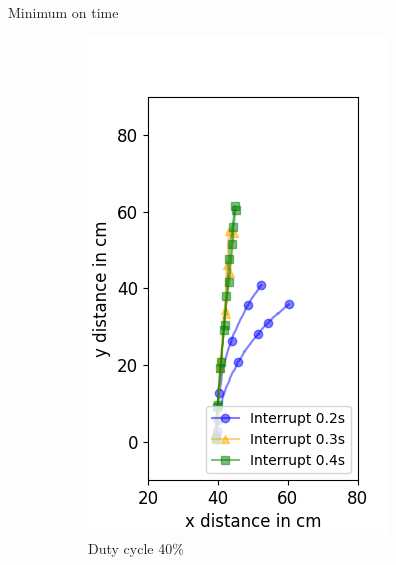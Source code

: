 \documentclass{beamer}
\begin{document}
\begin{frame}{Minimum on time}
	\begin{figure}
		\centering
		\begin{subfigure}[b]{0.32\textwidth}
			\includegraphics[width=\textwidth]{pics/figure_40.png}
			\caption*{Duty cycle 40\%}
		\end{subfigure}
		\hspace{2em}
		\begin{subfigure}[b]{0.32\textwidth}

\end{subfigure}
\end{figure}
\end{frame}
\end{document}
